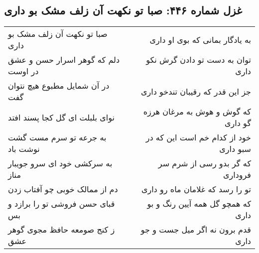 \begin{center}
\section*{غزل شماره ۴۴۶: صبا تو نکهت آن زلف مشک بو داری}
\label{sec:sh446}
\begin{longtable}{l p{0.5cm} r}
صبا تو نکهت آن زلف مشک بو داری
&&
به یادگار بمانی که بوی او داری
\\
دلم که گوهر اسرار حسن و عشق در اوست
&&
توان به دست تو دادن گرش نکو داری
\\
در آن شمایل مطبوع هیچ نتوان گفت
&&
جز این قدر که رقیبان تندخو داری
\\
نوای بلبلت ای گل کجا پسند افتد
&&
که گوش و هوش به مرغان هرزه گو داری
\\
به جرعه تو سرم مست گشت نوشت باد
&&
خود از کدام خم است این که در سبو داری
\\
به سرکشی خود ای سرو جویبار مناز
&&
که گر بدو رسی از شرم سر فروداری
\\
دم از ممالک خوبی چو آفتاب زدن
&&
تو را رسد که غلامان ماه رو داری
\\
قبای حسن فروشی تو را برازد و بس
&&
که همچو گل همه آیین رنگ و بو داری
\\
ز کنج صومعه حافظ مجوی گوهر عشق
&&
قدم برون نه اگر میل جست و جو داری
\\
\end{longtable}
\end{center}

